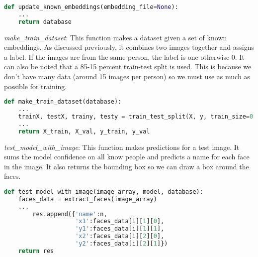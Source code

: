 \begin{center}{\begin{minipage}{0.9\linewidth}
\begin{lstlisting}[language=Python, basicstyle=\fontsize{10}{10}\selectfont\ttfamily]
def update_known_embeddings(embedding_file=None):
	... 
    return database
\end{lstlisting}
\end{minipage}}\end{center}

\textit{make\_train\_dataset}: This function makes a dataset given a set of known embeddings. As discussed previously, it combines two images together and assigns a label. If the images are from the same person, the label is one otherwise 0. It can also be noted that a 85-15 percent train-test split is used. This is because we don't have many data (around 15 images per person) so we must use as much as possible for training.

\begin{center}{\begin{minipage}{0.9\linewidth}
\begin{lstlisting}[language=Python, basicstyle=\fontsize{10}{10}\selectfont\ttfamily]
def make_train_dataset(database):
    ...
    trainX, testX, trainy, testy = train_test_split(X, y, train_size=0.85)
    ...
    return X_train, X_val, y_train, y_val
\end{lstlisting}
\end{minipage}}\end{center}

\textit{test\_model\_with\_image}: This function makes predictions for a test image. It sums the model confidence on all know people and predicts a name for each face in the image. It also returns the bounding box so we can draw a box around the faces. 

\begin{center}{\begin{minipage}{0.9\linewidth}
\begin{lstlisting}[language=Python, basicstyle=\fontsize{10}{10}\selectfont\ttfamily]
def test_model_with_image(image_array, model, database):
    faces_data = extract_faces(image_array)
	...
        res.append({'name':n,
                    'x1':faces_data[i][1][0],
                    'y1':faces_data[i][1][1],
                    'x2':faces_data[i][2][0],
                    'y2':faces_data[i][2][1]})
    return res
\end{lstlisting}
\end{minipage}}\end{center}

